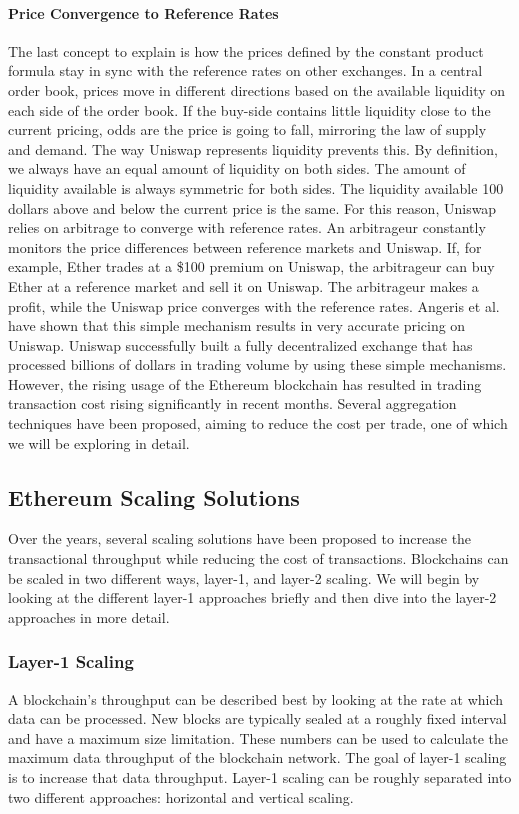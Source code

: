 \documentclass[../../thesis.tex]{subfiles}
\begin{document}
\paragraph{Price Convergence to Reference Rates}
The last concept to explain is how the prices defined by the constant product formula stay in sync with the reference rates on other exchanges. In a central order book, prices move in different directions based on the available liquidity on each side of the order book. If the buy-side contains little liquidity close to the current pricing, odds are the price is going to fall, mirroring the law of supply and demand. The way Uniswap represents liquidity prevents this. By definition, we always have an equal amount of liquidity on both sides. The amount of liquidity available is always symmetric for both sides. The liquidity available 100 dollars above and below the current price is the same.
For this reason, Uniswap relies on arbitrage to converge with reference rates. An arbitrageur constantly monitors the price differences between reference markets and Uniswap. If, for example, Ether trades at a \$100 premium on Uniswap, the arbitrageur can buy Ether at a reference market and sell it on Uniswap. The arbitrageur makes a profit, while the Uniswap price converges with the reference rates. Angeris et al. \cite{angeris2019analysis} have shown that this simple mechanism results in very accurate pricing on Uniswap. Uniswap successfully built a fully decentralized exchange that has processed billions of dollars in trading volume by using these simple mechanisms. However, the rising usage of the Ethereum blockchain has resulted in trading transaction cost rising significantly in recent months. Several aggregation techniques have been proposed, aiming to reduce the cost per trade, one of which we will be exploring in detail. 

\subsection{Ethereum Scaling Solutions}
Over the years, several scaling solutions have been proposed to increase the transactional throughput while reducing the cost of transactions. Blockchains can be scaled in two different ways, layer-1, and layer-2 scaling. We will begin by looking at the different layer-1 approaches briefly and then dive into the layer-2 approaches in more detail. 

\subsubsection{Layer-1 Scaling}
A blockchain's throughput can be described best by looking at the rate at which data can be processed. New blocks are typically sealed at a roughly fixed interval and have a maximum size limitation. These numbers can be used to calculate the maximum data throughput of the blockchain network. The goal of layer-1 scaling is to increase that data throughput. Layer-1 scaling can be roughly separated into two different approaches: horizontal and vertical scaling.
\end{document}
